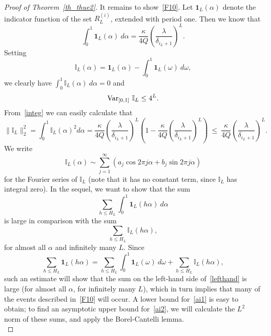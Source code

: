 \documentclass[12pt]{amsart}
\begin{document}
\begin{proof}[Proof of Theorem~\ref{th_thue2}]
It remains to show~\eqref{F10}. Let $\mathbf{1}_L(\alpha)$ denote the indicator function of the set $R^{\left(i\right)}_{L}$, extended with period one. Then we know that
\begin{equation} \label{integ}
\int_0^1 \mathbf{1}_L (\alpha) ~d \alpha =  \frac{\kappa}{4 Q} \left(\frac{\lambda}{\delta_{i_{L}+1}}\right)^{L}.
\end{equation}
Setting
$$
\mathbb{I}_L (\alpha) = \mathbf{1}_L (\alpha) - \int_0^1 \mathbf{1}_L (\omega) ~d \omega, 
$$
we clearly have $\int_0^1 \mathbb{I}_L(\alpha) ~d\alpha=0$ and 
\begin{equation} \label{ilvar}
\textup{Var}_{[0,1]} ~ \mathbb{I}_L \leq 4^L. 
\end{equation}
From~\eqref{integ} we can easily calculate that
\begin{equation} \label{il2norm}
\|\mathbb{I}_L\|_2^2 = \int_0^1 \mathbb{I}_L (\alpha)^2  d\alpha = \frac{\kappa}{4 Q} \left(\frac{\lambda}{\delta_{i_{L}+1}}\right)^{L} \left(1 - \frac{\kappa}{4 Q} \left(\frac{\lambda}{\delta_{i_{L}+1}}\right)^{L} \right) ~\leq~ \frac{\kappa}{4 Q} \left(\frac{\lambda}{\delta_{i_{L}+1}}\right)^{L}.
\end{equation}
We write 
$$
\mathbb{I}_L (\alpha) \sim \sum_{j=1}^\infty \left(a_j \cos 2 \pi j \alpha + b_j \sin 2 \pi j \alpha\right)
$$
for the Fourier series of $\mathbb{I}_L$ (note that it has no constant term, since $\mathbb{I}_L$ has integral zero). In the sequel, we want to show that the sum 
\begin{equation} \label{ai1}
\sum_{h \leq H_L} \int_0^1 \mathbf{1}_L (h \alpha) ~d \alpha
\end{equation}
is large in comparison with the sum 
\begin{equation} \label{ai2}
\sum_{h\leq H_L} \mathbb{I}_L (h \alpha),
\end{equation}
for almost all $\alpha$ and infinitely many $L$. Since
\begin{equation} \label{lefthand}
\sum_{h\leq H_L} \mathbf{1}_L (h \alpha) = \sum_{h\leq H_L} \int_0^1 \mathbf{1}_L (\omega) ~d \omega + \sum_{h\leq H_L} \mathbb{I}_L (h \alpha),
\end{equation}
such an estimate will show that the sum on the left-hand side of~\eqref{lefthand} is large (for almost all $\alpha$, for infinitely many $L$), which in turn implies that many of the events described in~\eqref{F10} will occur. A lower bound for~\eqref{ai1} is easy to obtain; to find an asymptotic upper bound for~\eqref{ai2}, we will calculate the $L^2$ norm of these sums, and apply the Borel-Cantelli lemma.\\


\end{proof}
\end{document}
